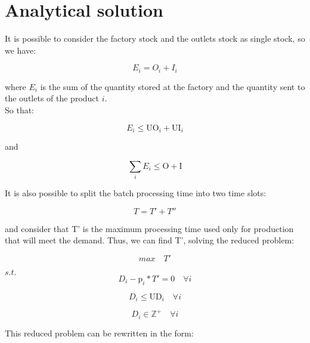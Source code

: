 \documentclass[preprint,12pt,authoryear]{elsarticle}
\begin{document}
\section{Analytical solution}
\label{}

It is possible to consider the factory stock and the outlets stock as single stock, so we have:

\begin{equation}
E_i = O_i + I_i
\end{equation}

where $E_i$ is the sum of the quantity stored at the factory and the quantity sent to the outlets of the product $i$. \\

So that:

\begin{equation}
E_i \leq \textrm{UO}_i + \textrm{UI}_i
\end{equation}

and

\begin{equation}
\sum_i {E_i} \leq \textrm{O} + \textrm{I}
\end{equation}


It is also possible to split the batch processing time into two time slots:

\begin{equation}
T = T' + T''
\end{equation}

and consider that T' is the maximum processing time used only for production that will meet the demand. Thus, we can find T', solving the reduced problem:


\begin{equation}
max \quad T'
\end{equation}

$s.t.$ \\

\begin{equation}
D_i - \textrm{p}_i * T'  = 0 \quad \forall i
\end{equation}

\begin{equation}
D_i \leq \textrm{UD}_i \quad \forall i
\end{equation}

\begin{equation}
D_i \in  \mathbb{Z}^+ \quad \forall i
\end{equation}

This reduced problem can be rewritten in the form:
\end{document}
